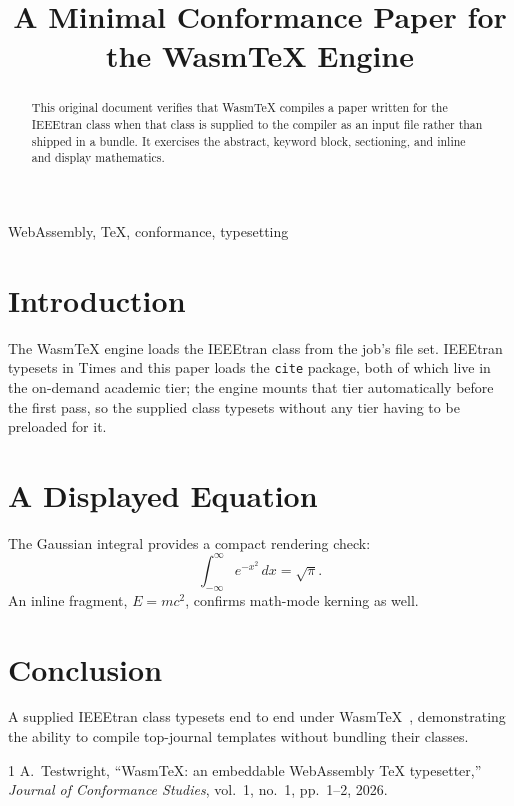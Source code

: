 \documentclass[conference]{IEEEtran}
\begin{document}
\title{A Minimal Conformance Paper for the WasmTeX Engine}

\author{
}

\maketitle

\begin{abstract}
This original document verifies that WasmTeX compiles a paper written for the
IEEEtran class when that class is supplied to the compiler as an input file
rather than shipped in a bundle. It exercises the abstract, keyword block,
sectioning, and inline and display mathematics.
\end{abstract}

\begin{IEEEkeywords}
WebAssembly, TeX, conformance, typesetting
\end{IEEEkeywords}

\section{Introduction}
The WasmTeX engine loads the IEEEtran class from the job's file set. IEEEtran
typesets in Times and this paper loads the \texttt{cite} package, both of which
live in the on-demand academic tier; the engine mounts that tier automatically
before the first pass, so the supplied class typesets without any tier having to
be preloaded for it.

\section{A Displayed Equation}
The Gaussian integral provides a compact rendering check:
\begin{equation}
\int_{-\infty}^{\infty} e^{-x^{2}}\, dx = \sqrt{\pi}.
\end{equation}
An inline fragment, $E = mc^{2}$, confirms math-mode kerning as well.

\section{Conclusion}
A supplied IEEEtran class typesets end to end under WasmTeX~\cite{wasmtex},
demonstrating the ability to compile top-journal templates without bundling
their classes.

\begin{thebibliography}{1}
A.~Testwright, ``WasmTeX: an embeddable WebAssembly TeX typesetter,''
\emph{Journal of Conformance Studies}, vol.~1, no.~1, pp.~1--2, 2026.
\end{thebibliography}
\end{document}
